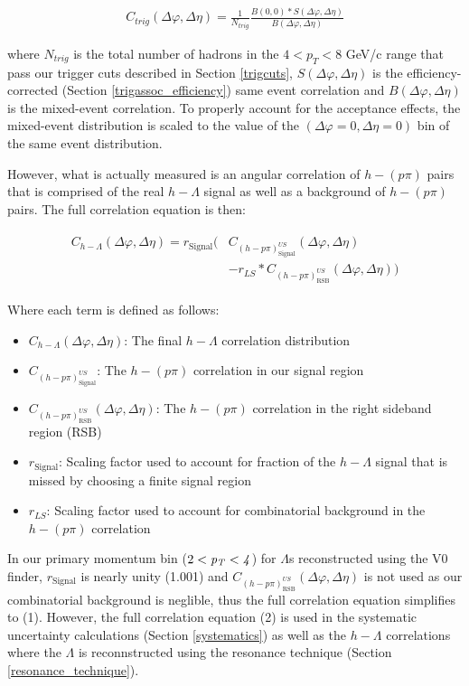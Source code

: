 \documentclass[ALICE,manyauthors]{ALICE_analysis_notes}
\begin{document}
\begin{align}
\label{corrEq}
C_{trig}(\Delta\varphi, \Delta\eta) = \frac{1}{N_{trig}}\frac{B(0,0)*S(\Delta\varphi,\Delta\eta)}{B(\Delta\varphi, \Delta\eta)}
\end{align}

where $N_{trig}$ is the total number of hadrons in the $4 < p_{T} < 8$ GeV/c range that pass our trigger cuts described in Section \ref{trigcuts}, $S(\Delta\varphi, \Delta\eta)$ is the efficiency-corrected (Section \ref{trigassoc_efficiency}) same event correlation and $B(\Delta\varphi, \Delta\eta)$ is the mixed-event correlation.  To properly account for the acceptance effects, the mixed-event distribution is scaled to the value of the $(\Delta\varphi = 0, \Delta\eta = 0)$ bin of the same event distribution.

However, what is actually measured is an angular correlation of $h-(p\pi)$ pairs that is comprised of the real $h-\Lambda$ signal as well as a background of $h-(p\pi)$ pairs. The full correlation equation is then:

\begin{align}
\label{corrEq_withBG}
\begin{split}
    C_{h-\Lambda}(\Delta\varphi, \Delta\eta) = r_{\text{Signal}}\biggl(&C_{(h-p\pi)^{US}_{\text{Signal}}}(\Delta\varphi, \Delta\eta)\\
    &- r_{LS}*C_{(h-p\pi)^{US}_{\text{RSB}}}(\Delta\varphi, \Delta\eta)\biggr)
\end{split}
\end{align}

Where each term is defined as follows:
\begin{itemize}
	\item $C_{h-\Lambda}(\Delta\varphi, \Delta\eta)$: The final $h-\Lambda$ correlation distribution
	\item $C_{(h-p\pi)^{US}_{\text{Signal}}}$: The $h-(p\pi)$ correlation in our signal region
	\item $C_{(h-p\pi)^{US}_{\text{RSB}}}(\Delta\varphi, \Delta\eta)$: The $h-(p\pi)$ correlation in the right sideband region (RSB)
	\item $r_{\text{Signal}}$: Scaling factor used to account for fraction of the $h-\Lambda$ signal that is missed by choosing a finite signal region
	\item $r_{LS}$: Scaling factor used to account for combinatorial background in the $h-(p\pi)$ correlation
\end{itemize}

In our primary momentum bin ($2 < \it{p}_{T} < 4$) for $\Lambda$s reconstructed using the V0 finder, $r_{\text{Signal}}$ is nearly unity (1.001) and $C_{(h-p\pi)^{US}_{\text{RSB}}}(\Delta\varphi, \Delta\eta)$ is not used as our combinatorial background is neglible, thus the full correlation equation simplifies to (1). However, the full correlation equation (2) is used in the systematic uncertainty calculations (Section \ref{systematics}) as well as the $h-\Lambda$ correlations where the $\Lambda$ is reconnstructed using the resonance technique  (Section \ref{resonance_technique}).
\end{document}
